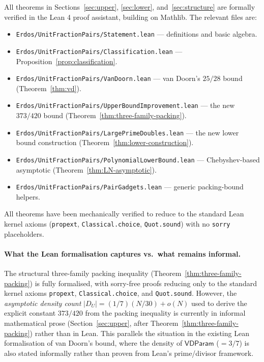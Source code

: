 \documentclass[11pt]{amsart}
\theoremstyle{plain}
\theoremstyle{definition}
\newcommand{\vdp}{\mathsf{VDParam}}
\begin{document}
All theorems in Sections~\ref{sec:upper}, \ref{sec:lower}, and~\ref{sec:structure} are formally verified in the Lean 4 proof assistant, building on Mathlib. The relevant files are:
\begin{itemize}
  \item \texttt{Erdos/UnitFractionPairs/Statement.lean} --- definitions and basic algebra.
  \item \texttt{Erdos/UnitFractionPairs/Classification.lean} --- Proposition~\ref{prop:classification}.
  \item \texttt{Erdos/UnitFractionPairs/VanDoorn.lean} --- van Doorn's $25/28$ bound (Theorem~\ref{thm:vd}).
  \item \texttt{Erdos/UnitFractionPairs/UpperBoundImprovement.lean} --- the new $373/420$ bound (Theorem~\ref{thm:three-family-packing}).
  \item \texttt{Erdos/UnitFractionPairs/LargePrimeDoubles.lean} --- the new lower bound construction (Theorem~\ref{thm:lower-construction}).
  \item \texttt{Erdos/UnitFractionPairs/PolynomialLowerBound.lean} --- Chebyshev-based asymptotic (Theorem~\ref{thm:LN-asymptotic}).
  \item \texttt{Erdos/UnitFractionPairs/PairGadgets.lean} --- generic packing-bound helpers.
\end{itemize}

All theorems have been mechanically verified to reduce to the standard Lean kernel axioms (\texttt{propext}, \texttt{Classical.choice}, \texttt{Quot.sound}) with no \texttt{sorry} placeholders.

\paragraph{What the Lean formalisation captures vs.\ what remains informal.} The structural three-family packing inequality (Theorem~\ref{thm:three-family-packing}) is fully formalised, with sorry-free proofs reducing only to the standard kernel axioms \texttt{propext}, \texttt{Classical.choice}, and \texttt{Quot.sound}. However, the \emph{asymptotic density count} $|D_U| = (1/7)(N/30) + o(N)$ used to derive the explicit constant $373/420$ from the packing inequality is currently in informal mathematical prose (Section~\ref{sec:upper}, after Theorem~\ref{thm:three-family-packing}) rather than in Lean. This parallels the situation in the existing Lean formalisation of van Doorn's bound, where the density of $\vdp$ ($= 3/7$) is also stated informally rather than proven from Lean's prime/divisor framework.
\end{document}
